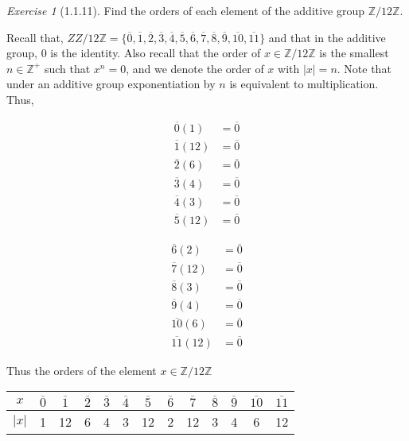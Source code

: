 \documentclass[12pt]{amsart}
\makeatletter
\theoremstyle{remark}
\newtheorem*{exercise}{Exercise}%
\def\ZZ{\ensuremath{\mathbb Z}}
\renewenvironment{proof}[1][\proofname]{\par\doublespacing
  \pushQED{\qed}%
  \normalfont \topsep6\p@\@plus6\p@\relax
  \list{}{%
    \settowidth{\leftmargin}{\itshape\proofname:\hskip\labelsep}%
    \setlength{\labelwidth}{0pt}%
    \setlength{\itemindent}{-\leftmargin}%
  }%
  \item[\hskip\labelsep\itshape#1\@addpunct{:}]\ignorespaces
}{%
  \popQED\endlist\@endpefalse
  \singlespacing
}
\theoremstyle{mycomment}
\makeatother
\begin{document}
\begin{exercise}[1.1.11] Find the orders of each element of the additive group $\ZZ/12\ZZ$. 
  \begin{proof}[Solution:]
    Recall that, $ZZ/12\ZZ = \{\overline{0}, \overline{1}, \overline{2}, \overline{3}, \overline{4}, \overline{5}, \overline{6}, \overline{7}, \overline{8}, \overline{9}, \overline{10}, \overline{11}\}$ 
    and that in the additive group, $0$ is the identity. Also recall that the order of $x \in \ZZ /12\ZZ$ is the smallest $n \in \ZZ^+$ such that $x^n = 0$, and we denote the order of $x$ with 
    $|x| = n$. Note that under an additive group exponentiation by $n$ is equivalent to multiplication. Thus, 

    \begin{center}
      \begin{minipage}{.45\textwidth}
    \begin{align*}
      \overline{0}(1) &= \overline{0}\\
      \overline{1}(12) &= \overline{0}\\
      \overline{2}(6) &= \overline{0}\\ 
      \overline{3}(4)  &= \overline{0}\\
      \overline{4}(3)  &= \overline{0}\\
      \overline{5}(12)  &= \overline{0}
    \end{align*}
  \end{minipage}
  \hfill
      \begin{minipage}{.45\textwidth}
      \begin{align*}
      \overline{6}(2)  &= \overline{0}\\
      \overline{7}(12)  &= \overline{0}\\
      \overline{8}(3)  &= \overline{0}\\
      \overline{9}(4)  &= \overline{0}\\
      \overline{10}(6)  &= \overline{0}\\
      \overline{11}(12)  &= \overline{0}
    \end{align*}
  \end{minipage}
\end{center}
    Thus the orders of the element $ x \in \ZZ /12\ZZ$ 
    \begin{center}
    \begin{tabular}{c | c  c  c  c  c  c  c  c  c  c  c  c  }
      $x$ &$\overline{0}$& $\overline{1}$& $\overline{2}$& $\overline{3}$& $\overline{4}$& $\overline{5}$& $\overline{6}$& $\overline{7}$& $\overline{8}$& $\overline{9}$& $\overline{10}$ & $\overline{11}$ \\
      \hline
      $|x|$&1&12&6&4&3&12&2&12&3&4&6&12
    \end{tabular}
  \end{center}
    
    \end{proof}
\end{exercise}
\end{document}
